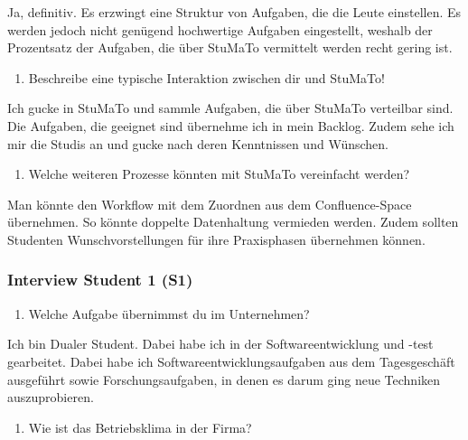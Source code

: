 \documentclass[
  12pt,
  ngerman,
  a4paper,
]{article}
\providecommand{\tightlist}{%
  \setlength{\itemsep}{0pt}\setlength{\parskip}{0pt}}
\begin{document}
Ja, definitiv. Es erzwingt eine Struktur von Aufgaben, die die Leute
einstellen. Es werden jedoch nicht genügend hochwertige Aufgaben
eingestellt, weshalb der Prozentsatz der Aufgaben, die über StuMaTo
vermittelt werden recht gering ist.

\begin{enumerate}
\def\labelenumi{\arabic{enumi}.}
\setcounter{enumi}{12}
\tightlist
\item
  Beschreibe eine typische Interaktion zwischen dir und StuMaTo!
\end{enumerate}

Ich gucke in StuMaTo und sammle Aufgaben, die über StuMaTo verteilbar
sind. Die Aufgaben, die geeignet sind übernehme ich in mein Backlog.
Zudem sehe ich mir die Studis an und gucke nach deren Kenntnissen und
Wünschen.

\begin{enumerate}
\def\labelenumi{\arabic{enumi}.}
\setcounter{enumi}{13}
\tightlist
\item
  Welche weiteren Prozesse könnten mit StuMaTo vereinfacht werden?
\end{enumerate}

Man könnte den Workflow mit dem Zuordnen aus dem Confluence-Space
übernehmen. So könnte doppelte Datenhaltung vermieden werden. Zudem
sollten Studenten Wunschvorstellungen für ihre Praxisphasen übernehmen
können.

\hypertarget{interview-student-1-s1}{%
\subsubsection{Interview Student 1 (S1)}\label{interview-student-1-s1}}

\begin{enumerate}
\def\labelenumi{\arabic{enumi}.}
\tightlist
\item
  Welche Aufgabe übernimmst du im Unternehmen?
\end{enumerate}

Ich bin Dualer Student. Dabei habe ich in der Softwareentwicklung und
-test gearbeitet. Dabei habe ich Softwareentwicklungsaufgaben aus dem
Tagesgeschäft ausgeführt sowie Forschungsaufgaben, in denen es darum
ging neue Techniken auszuprobieren.

\begin{enumerate}
\def\labelenumi{\arabic{enumi}.}
\setcounter{enumi}{1}
\tightlist
\item
  Wie ist das Betriebsklima in der Firma?
\end{enumerate}
\end{document}
